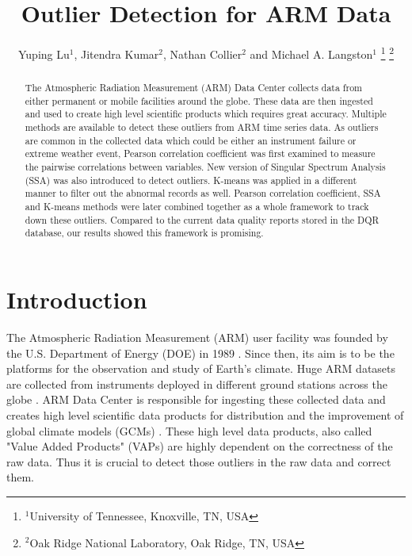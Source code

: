 \documentclass[letterpaper, 10 pt, conference]{ieeeconf}  %
\title{\LARGE \bf
Outlier Detection for ARM Data
}
\author{Yuping Lu$^{1}$, Jitendra Kumar$^{2}$, Nathan Collier$^{2}$ and Michael A. Langston$^{1}$%
\thanks{$^{1}$University of Tennessee, Knoxville, TN, USA}%
\thanks{$^{2}$Oak Ridge National Laboratory, Oak Ridge, TN, USA}%
}
\begin{document}
\maketitle
\thispagestyle{empty}
\pagestyle{empty}

\begin{abstract}

The Atmospheric Radiation Measurement (ARM) Data Center collects data from either permanent or mobile facilities around the globe. These data are then ingested and used to create high level scientific products which requires great accuracy. Multiple methods are available to detect these outliers from ARM time series data. As outliers are common in the collected data which could be either an instrument failure or extreme weather event, Pearson correlation coefficient was first examined to measure the pairwise correlations between variables. New version of Singular Spectrum Analysis (SSA) was also introduced to detect outliers. K-means was applied in a different manner to filter out the abnormal records as well. Pearson correlation coefficient, SSA and K-means methods were later combined together as a whole framework to track down these outliers. Compared to the current data quality reports stored in the DQR database, our results showed this framework is promising.

\end{abstract}


\section{Introduction}
The Atmospheric Radiation Measurement (ARM) user facility was founded by the U.S. Department of Energy (DOE) in 1989 \cite{ARM}. Since then, its aim is to be the platforms for the observation and study of Earth's climate. Huge ARM datasets are collected from instruments deployed in different ground stations across the globe \cite{stokes1994atmospheric}. ARM Data Center is responsible for ingesting these collected data and creates high level scientific data products for distribution and the improvement of global climate models (GCMs) \cite{gaustad2014scientific}. These high level data products, also called "Value Added Products" (VAPs) are highly dependent on the correctness of the raw data. Thus it is crucial to detect those outliers in the raw data and correct them.
\end{document}
